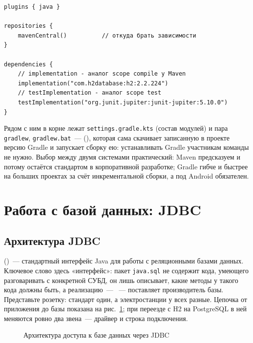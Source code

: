 \begin{listing}[H]
\begin{verbatim}
plugins { java }

repositories {
    mavenCentral()          // откуда брать зависимости
}

dependencies {
    // implementation - аналог scope compile у Maven
    implementation("com.h2database:h2:2.2.224")
    // testImplementation - аналог scope test
    testImplementation("org.junit.jupiter:junit-jupiter:5.10.0")
}
\end{verbatim}
\caption{Файл build.gradle.kts}
\label{lst:06-3}
\end{listing}

Рядом с ним в корне лежат \texttt{settings.gradle.kts} (состав модулей) и пара
\texttt{gradlew}, \texttt{gradlew.bat}~--- 
(), которая сама скачивает записанную в проекте версию
Gradle и запускает сборку ею: устанавливать Gradle участникам команды не
нужно. Выбор между двумя системами практический: Maven предсказуем и потому
остаётся стандартом в корпоративной разработке; Gradle гибче и быстрее на
больших проектах за счёт инкрементальной сборки, а под Android обязателен.

\section{Работа с базой данных: JDBC}

\subsection{Архитектура JDBC}

 ()~--- стандартный интерфейс Java
для работы с реляционными базами данных. Ключевое слово здесь
«интерфейс»: пакет \texttt{java.sql} не содержит кода, умеющего разговаривать
с конкретной СУБД, он лишь описывает, какие методы у такого кода должны быть,
а реализацию~--- ~--- поставляет производитель базы. Представьте
розетку: стандарт один, а электростанции у всех разные. Цепочка от приложения
до базы показана на рис.~\ref{fig:06-2}; при переезде с H2 на PostgreSQL в ней
меняются ровно два звена~--- драйвер и строка подключения.

\begin{figure}[htbp]\centering
{}
\caption{Архитектура доступа к базе данных через JDBC}\label{fig:06-2}
\end{figure}

